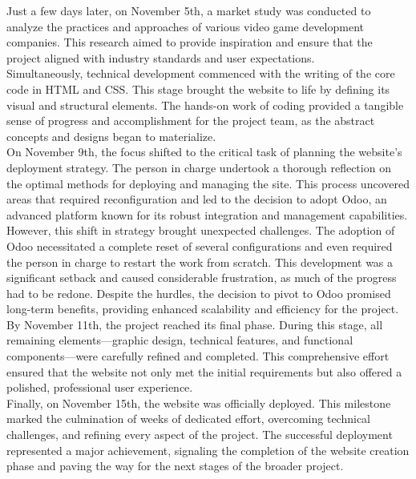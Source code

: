 \documentclass{article}
\begin{document}
Just a few days later, on November 5th, a market study was conducted to analyze the practices and approaches of various video game development companies. This research aimed to provide inspiration and ensure that the project aligned with industry standards and user expectations.\\

Simultaneously, technical development commenced with the writing of the core code in HTML and CSS. This stage brought the website to life by defining its visual and structural elements. The hands-on work of coding provided a tangible sense of progress and accomplishment for the project team, as the abstract concepts and designs began to materialize.\\

On November 9th, the focus shifted to the critical task of planning the website's deployment strategy. The person in charge undertook a thorough reflection on the optimal methods for deploying and managing the site. This process uncovered areas that required reconfiguration and led to the decision to adopt Odoo, an advanced platform known for its robust integration and management capabilities.\\

However, this shift in strategy brought unexpected challenges. The adoption of Odoo necessitated a complete reset of several configurations and even required the person in charge to restart the work from scratch. This development was a significant setback and caused considerable frustration, as much of the progress had to be redone. Despite the hurdles, the decision to pivot to Odoo promised long-term benefits, providing enhanced scalability and efficiency for the project.\\

By November 11th, the project reached its final phase. During this stage, all remaining elements—graphic design, technical features, and functional components—were carefully refined and completed. This comprehensive effort ensured that the website not only met the initial requirements but also offered a polished, professional user experience.\\

Finally, on November 15th, the website was officially deployed. This milestone marked the culmination of weeks of dedicated effort, overcoming technical challenges, and refining every aspect of the project. The successful deployment represented a major achievement, signaling the completion of the website creation phase and paving the way for the next stages of the broader project.
\end{document}
